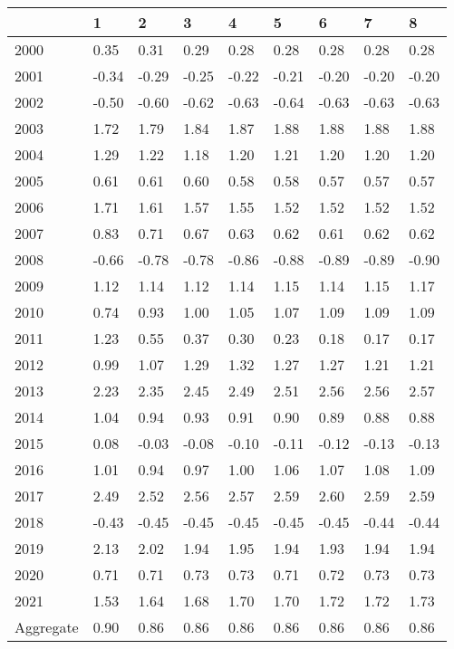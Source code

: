\begin{tabular}{lllllllll}
\toprule
 & 1 & 2 & 3 & 4 & 5 & 6 & 7 & 8 \\
\midrule
2000 & 0.35 & 0.31 & 0.29 & 0.28 & 0.28 & 0.28 & 0.28 & 0.28 \\
2001 & -0.34 & -0.29 & -0.25 & -0.22 & -0.21 & -0.20 & -0.20 & -0.20 \\
2002 & -0.50 & -0.60 & -0.62 & -0.63 & -0.64 & -0.63 & -0.63 & -0.63 \\
2003 & 1.72 & 1.79 & 1.84 & 1.87 & 1.88 & 1.88 & 1.88 & 1.88 \\
2004 & 1.29 & 1.22 & 1.18 & 1.20 & 1.21 & 1.20 & 1.20 & 1.20 \\
2005 & 0.61 & 0.61 & 0.60 & 0.58 & 0.58 & 0.57 & 0.57 & 0.57 \\
2006 & 1.71 & 1.61 & 1.57 & 1.55 & 1.52 & 1.52 & 1.52 & 1.52 \\
2007 & 0.83 & 0.71 & 0.67 & 0.63 & 0.62 & 0.61 & 0.62 & 0.62 \\
2008 & -0.66 & -0.78 & -0.78 & -0.86 & -0.88 & -0.89 & -0.89 & -0.90 \\
2009 & 1.12 & 1.14 & 1.12 & 1.14 & 1.15 & 1.14 & 1.15 & 1.17 \\
2010 & 0.74 & 0.93 & 1.00 & 1.05 & 1.07 & 1.09 & 1.09 & 1.09 \\
2011 & 1.23 & 0.55 & 0.37 & 0.30 & 0.23 & 0.18 & 0.17 & 0.17 \\
2012 & 0.99 & 1.07 & 1.29 & 1.32 & 1.27 & 1.27 & 1.21 & 1.21 \\
2013 & 2.23 & 2.35 & 2.45 & 2.49 & 2.51 & 2.56 & 2.56 & 2.57 \\
2014 & 1.04 & 0.94 & 0.93 & 0.91 & 0.90 & 0.89 & 0.88 & 0.88 \\
2015 & 0.08 & -0.03 & -0.08 & -0.10 & -0.11 & -0.12 & -0.13 & -0.13 \\
2016 & 1.01 & 0.94 & 0.97 & 1.00 & 1.06 & 1.07 & 1.08 & 1.09 \\
2017 & 2.49 & 2.52 & 2.56 & 2.57 & 2.59 & 2.60 & 2.59 & 2.59 \\
2018 & -0.43 & -0.45 & -0.45 & -0.45 & -0.45 & -0.45 & -0.44 & -0.44 \\
2019 & 2.13 & 2.02 & 1.94 & 1.95 & 1.94 & 1.93 & 1.94 & 1.94 \\
2020 & 0.71 & 0.71 & 0.73 & 0.73 & 0.71 & 0.72 & 0.73 & 0.73 \\
2021 & 1.53 & 1.64 & 1.68 & 1.70 & 1.70 & 1.72 & 1.72 & 1.73 \\
Aggregate & 0.90 & 0.86 & 0.86 & 0.86 & 0.86 & 0.86 & 0.86 & 0.86 \\
\bottomrule
\end{tabular}
